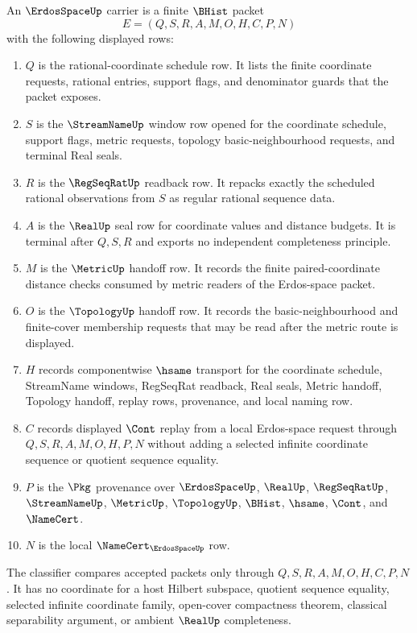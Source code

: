 \begin{definition}
\label{def:erdos-space-carrier}
An $\ErdosSpaceUp$ carrier is a finite $\BHist$ packet
$$
E=(Q,S,R,A,M,O,H,C,P,N)
$$
with the following displayed rows:
\begin{enumerate}
\item $Q$ is the rational-coordinate schedule row. It lists the finite coordinate requests, rational entries, support flags, and denominator guards that the packet exposes.
\item $S$ is the $\StreamNameUp$ window row opened for the coordinate schedule, support flags, metric requests, topology basic-neighbourhood requests, and terminal Real seals.
\item $R$ is the $\RegSeqRatUp$ readback row. It repacks exactly the scheduled rational observations from $S$ as regular rational sequence data.
\item $A$ is the $\RealUp$ seal row for coordinate values and distance budgets. It is terminal after $Q,S,R$ and exports no independent completeness principle.
\item $M$ is the $\MetricUp$ handoff row. It records the finite paired-coordinate distance checks consumed by metric readers of the Erdos-space packet.
\item $O$ is the $\TopologyUp$ handoff row. It records the basic-neighbourhood and finite-cover membership requests that may be read after the metric route is displayed.
\item $H$ records componentwise $\hsame$ transport for the coordinate schedule, StreamName windows, RegSeqRat readback, Real seals, Metric handoff, Topology handoff, replay rows, provenance, and local naming row.
\item $C$ records displayed $\Cont$ replay from a local Erdos-space request through $Q,S,R,A,M,O,H,P,N$ without adding a selected infinite coordinate sequence or quotient sequence equality.
\item $P$ is the $\Pkg$ provenance over $\ErdosSpaceUp$, $\RealUp$, $\RegSeqRatUp$, $\StreamNameUp$, $\MetricUp$, $\TopologyUp$, $\BHist$, $\hsame$, $\Cont$, and $\NameCert$.
\item $N$ is the local $\NameCert_{\ErdosSpaceUp}$ row.
\end{enumerate}
The classifier compares accepted packets only through $Q,S,R,A,M,O,H,C,P,N$. It has no coordinate for a host Hilbert subspace, quotient sequence equality, selected infinite coordinate family, open-cover compactness theorem, classical separability argument, or ambient $\RealUp$ completeness.
\end{definition}

